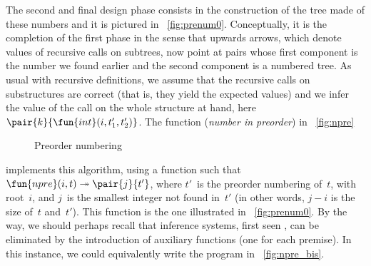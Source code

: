 The second and final design phase consists in the construction of the
tree made of these numbers and it is pictured in
\fig~\vref{fig:prenum0}. Conceptually, it is the completion of the
first phase in the sense that upwards arrows, which denote values of
recursive calls on subtrees, now point at pairs whose first component
is the number we found earlier and the second component is a numbered
tree. As usual with recursive definitions, we assume that the
recursive calls on substructures are correct (that is, they yield the
expected values) and we infer the value of the call on the whole
structure at hand, here \(\pair{k}{\fun{int}(i,t'_1,t'_2)}\). The function
 (\emph{number in preorder}) in
\fig~\vref{fig:npre}
\begin{figure}[b]
\abovedisplayskip=0pt
\belowdisplayskip=0pt
\centering
{}
\caption{Preorder numbering}
\label{fig:npre}
\end{figure}
implements this algorithm, using a function
 such that \(\fun{npre}(i,t)
\twoheadrightarrow \pair{j}{t'}\), where \(t'\)~is the preorder
numbering of~\(t\), with root~\(i\), and \(j\)~is the smallest integer
not found in~\(t'\) (in other words, \(j-i\) is the size of~\(t\)
and~\(t'\)). This function is the one illustrated in
\fig~\vref{fig:prenum0}. By the way, we should perhaps recall that
inference systems, first seen
, can be eliminated by the introduction of
auxiliary functions (one for each premise). In this instance, we could
equivalently write the program in
\fig~\vref{fig:npre_bis}.
